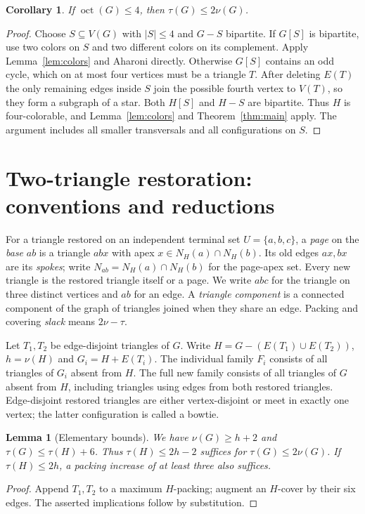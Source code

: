 \documentclass[11pt]{article}
\newtheorem{lemma}[theorem]{Lemma}
\newtheorem{corollary}[theorem]{Corollary}
\theoremstyle{definition}\newtheorem{definition}[theorem]{Definition}
\theoremstyle{remark}\newtheorem{remark}[theorem]{Remark}
\newcommand{\oct}{\operatorname{oct}}
\begin{document}
\begin{corollary}\label{cor:oct}
If $\oct(G)\le4$, then $\tau(G)\le2\nu(G)$.
\end{corollary}
\begin{proof}\leavevmode
Choose $S\subseteq V(G)$ with $|S|\le4$ and $G-S$ bipartite. If
$G[S]$ is bipartite, use two colors on $S$ and two different colors on
its complement. Apply Lemma~\ref{lem:colors} and Aharoni directly.
Otherwise $G[S]$ contains an odd cycle, which on at most four vertices
must be a triangle $T$. After deleting $E(T)$ the only remaining edges
inside $S$ join the possible fourth vertex to $V(T)$, so they form a
subgraph of a star. Both $H[S]$ and $H-S$ are bipartite. Thus $H$ is
four-colorable, and Lemma~\ref{lem:colors} and Theorem~\ref{thm:main} apply.
The argument includes all smaller transversals and all configurations on $S$.
\end{proof}


\section{Two-triangle restoration: conventions and reductions}\label{sec:two-conventions}
For a triangle restored on an independent terminal set $U=\{a,b,c\}$, a \emph{page} on the \emph{base} $ab$ is a triangle $abx$ with apex $x\in N_H(a)\cap N_H(b)$. Its old edges $ax,bx$ are its \emph{spokes}; write $N_{ab}=N_H(a)\cap N_H(b)$ for the page-apex set. Every new triangle is the restored triangle itself or a page. We write $abc$ for the triangle on three distinct vertices and $ab$ for an edge. A \emph{triangle component} is a connected component of the graph of triangles joined when they share an edge. Packing and covering \emph{slack} means $2\nu-\tau$.

Let $T_1,T_2$ be edge-disjoint triangles of $G$. Write $H=G-(E(T_1)\cup E(T_2))$, $h=\nu(H)$ and $G_i=H+E(T_i)$. The individual family $F_i$ consists of all triangles of $G_i$ absent from $H$. The full new family consists of all triangles of $G$ absent from $H$, including triangles using edges from both restored triangles. Edge-disjoint restored triangles are either vertex-disjoint or meet in exactly one vertex; the latter configuration is called a bowtie.
\begin{lemma}[Elementary bounds]\label{lem:elementary}
We have $\nu(G)\ge h+2$ and $\tau(G)\le\tau(H)+6$. Thus $\tau(H)\le2h-2$ suffices for $\tau(G)\le2\nu(G)$. If $\tau(H)\le2h$, a packing increase of at least three also suffices.
\end{lemma}
\begin{proof}\leavevmode
Append $T_1,T_2$ to a maximum $H$-packing; augment an $H$-cover by their six edges. The asserted implications follow by substitution.
\end{proof}
\end{document}
